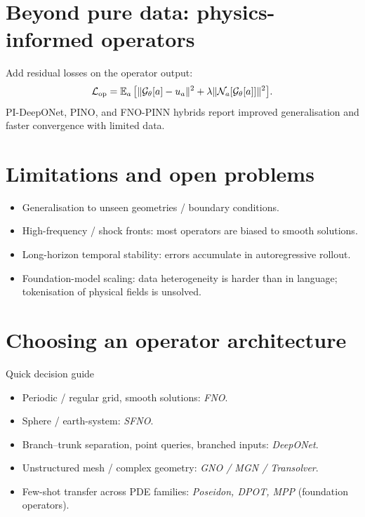 \section{Beyond pure data: physics-informed operators}
Add residual losses on the operator output:
\begin{equation}
\mathcal{L}_{\text{op}}=\operatorname{\mathbb{E}}_{a}\big[\|\mathcal{G}_\theta[a]-u_a\|^2 + \lambda\|\mathcal{N}_a[\mathcal{G}_\theta[a]]\|^2\big].
\end{equation}
PI-DeepONet, PINO, and FNO-PINN hybrids report improved generalisation
and faster convergence with limited data.

\section{Limitations and open problems}
\begin{itemize}
\item Generalisation to unseen geometries / boundary conditions.
\item High-frequency / shock fronts: most operators are biased to
smooth solutions.
\item Long-horizon temporal stability: errors accumulate in
autoregressive rollout.
\item Foundation-model scaling: data heterogeneity is harder than in
language; tokenisation of physical fields is unsolved.
\end{itemize}

\section{Choosing an operator architecture}
\begin{insight}{Quick decision guide}
\begin{itemize}
\item Periodic / regular grid, smooth solutions: \emph{FNO}.
\item Sphere / earth-system: \emph{SFNO}.
\item Branch--trunk separation, point queries, branched inputs:
\emph{DeepONet}.
\item Unstructured mesh / complex geometry: \emph{GNO / MGN /
Transolver}.
\item Few-shot transfer across PDE families: \emph{Poseidon, DPOT,
MPP} (foundation operators).
\end{itemize}
\end{insight}
